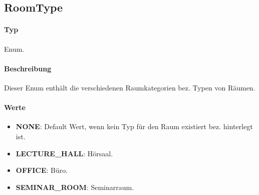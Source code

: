 \subsection{RoomType}
\paragraph*{Typ}
Enum.
\paragraph*{Beschreibung}
Dieser Enum enthält die verschiedenen Raumkategorien bez. Typen von Räumen.

\paragraph*{Werte}
\begin{itemize}
    \item \textbf{NONE}: Default Wert, wenn kein Typ für den Raum existiert bez. hinterlegt ist.
    \item \textbf{LECTURE\_HALL}: Hörsaal.
    \item \textbf{OFFICE}: Büro.
    \item \textbf{SEMINAR\_ROOM}: Seminarraum.
\end{itemize}
